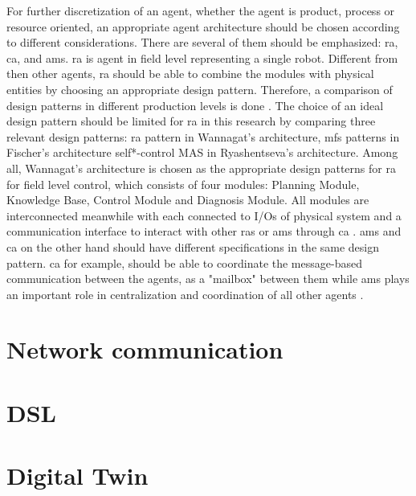 For further discretization of an agent, whether the agent is product, process or resource oriented, an appropriate agent architecture should be chosen according to different considerations. There are several of them should be emphasized: \gls{ra}, \gls{ca}, and \gls{ams}. \gls{ra} is agent in field level representing a single robot. Different from then other agents, \gls{ra} should be able to combine the modules with physical entities by choosing an appropriate design pattern. Therefore, a comparison of design patterns in different production levels is done \cite{ocker_leveraging_2021}. The choice of an ideal design pattern should be limited for \gls{ra} in this research by comparing three relevant design patterns:  \gls{ra} pattern in Wannagat’s architecture, \gls{mfs} patterns in Fischer’s architecture self*-control MAS in Ryashentseva’s architecture. Among all,  Wannagat’s architecture is chosen as the appropriate design patterns for \gls{ra} for field level control, which consists of four modules: Planning Module, Knowledge Base, Control Module and Diagnosis Module. All modules are interconnected meanwhile with each connected to I/Os of physical system and a communication interface to interact with other \gls{ras} or \gls{ams} through \gls{ca} \cite{cruz_salazar_cyber-physical_2019}. \gls{ams} and \gls{ca} on the other hand should have different specifications in the same design pattern. \gls{ca} for example, should be able to coordinate the message-based communication between the agents, as a "mailbox" between them while \gls{ams} plays an important role in centralization and coordination of all other agents \cite{wannagat_entwicklung_2010}. 

\section{Network communication}
\section{DSL}
\section{Digital Twin}


